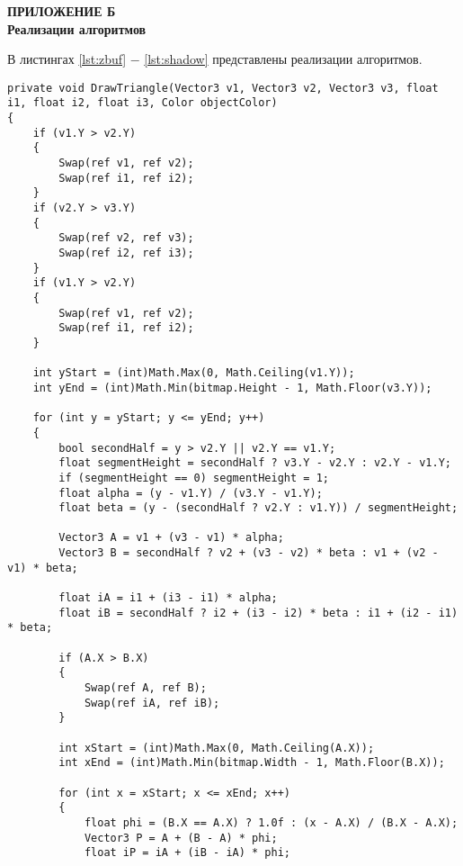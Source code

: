 \begin{center}
    \textbf{ПРИЛОЖЕНИЕ Б\\Реализации алгоритмов}
\end{center}

В листингах \ref{lst:zbuf} $-$ \ref{lst:shadow} представлены реализации алгоритмов.

\begin{center}
\captionsetup{justification=raggedright,singlelinecheck=off}
\begin{lstlisting}[label=lst:zbuf,caption=Алгоритм отрисовки полигона с помощью Z-буффера,numbers=none]
private void DrawTriangle(Vector3 v1, Vector3 v2, Vector3 v3, float i1, float i2, float i3, Color objectColor)
{
    if (v1.Y > v2.Y)
    {
        Swap(ref v1, ref v2);
        Swap(ref i1, ref i2);
    }
    if (v2.Y > v3.Y)
    {
        Swap(ref v2, ref v3);
        Swap(ref i2, ref i3);
    }
    if (v1.Y > v2.Y)
    {
        Swap(ref v1, ref v2);
        Swap(ref i1, ref i2);
    }

    int yStart = (int)Math.Max(0, Math.Ceiling(v1.Y));
    int yEnd = (int)Math.Min(bitmap.Height - 1, Math.Floor(v3.Y));

    for (int y = yStart; y <= yEnd; y++)
    {
        bool secondHalf = y > v2.Y || v2.Y == v1.Y;
        float segmentHeight = secondHalf ? v3.Y - v2.Y : v2.Y - v1.Y;
        if (segmentHeight == 0) segmentHeight = 1;
        float alpha = (y - v1.Y) / (v3.Y - v1.Y);
        float beta = (y - (secondHalf ? v2.Y : v1.Y)) / segmentHeight;

        Vector3 A = v1 + (v3 - v1) * alpha;
        Vector3 B = secondHalf ? v2 + (v3 - v2) * beta : v1 + (v2 - v1) * beta;

        float iA = i1 + (i3 - i1) * alpha;
        float iB = secondHalf ? i2 + (i3 - i2) * beta : i1 + (i2 - i1) * beta;

        if (A.X > B.X)
        {
            Swap(ref A, ref B);
            Swap(ref iA, ref iB);
        }

        int xStart = (int)Math.Max(0, Math.Ceiling(A.X));
        int xEnd = (int)Math.Min(bitmap.Width - 1, Math.Floor(B.X));

        for (int x = xStart; x <= xEnd; x++)
        {
            float phi = (B.X == A.X) ? 1.0f : (x - A.X) / (B.X - A.X);
            Vector3 P = A + (B - A) * phi;
            float iP = iA + (iB - iA) * phi;


\end{lstlisting}
\end{center}

